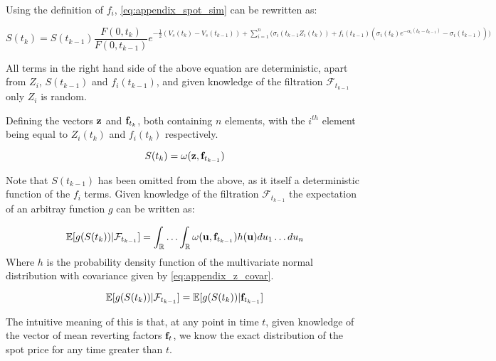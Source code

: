\documentclass{article}
\begin{document}
Using the definition of $f_i$, \ref{eq:appendix_spot_sim} can be rewritten as:

\begin{equation}
    S(t_k) = S(t_{k-1}) \frac{F(0, t_k)}{F(0, t_{k-1})} e^{- \frac{1}{2} (V_s(t_k) - 
    V_s(t_{k-1})) + \sum_{i=1}^n \bigl(\sigma_i(t_{k-1}Z_i(t_k)) + f_i(t_{k-1})
    (\sigma_i(t_k) e^{-\alpha_i (t_k - t_{k-1})} - \sigma_i(t_{k-1}) ) \bigr)}
\end{equation}

All terms in the right hand side of the above equation are deterministic, apart from 
$Z_i$, $S(t_{k-1})$ and $f_i(t_{k-1})$, and given knowledge of the filtration 
$\mathcal{F}_{t_{k-1}}$ only $Z_i$ is random.

\bigskip
Defining the vectors $\mathbf{z}$ and $\mathbf{f}_{t_k}$, both containing $n$ elements, with the $i^{th}$ element 
being equal to $Z_i(t_k)$ and $f_i(t_k)$ respectively.

\begin{equation}
    S(t_k) = \omega(\mathbf{z}, \mathbf{f}_{t_{k-1}})
\end{equation}

Note that $S(t_{k-1})$ has been omitted from the above, as it itself a deterministic
function of the $f_i$ terms.
Given knowledge of the filtration $\mathcal{F}_{t_{k-1}}$ the expectation of an arbitray
function $g$ can be written as:

\begin{equation}
    \mathbb{E}[g(S(t_k)) | \mathcal{F}_{t_{k-1}}] = 
        \int_\mathbb{R} \hdots \int_\mathbb{R} \omega(\mathbf{u}, \mathbf{f}_{t_{k-1}})
        h(\mathbf{u}) du_1 \hdots du_n
\end{equation}
Where $h$ is the probability density function of the multivariate normal distribution
with covariance given by \ref{eq:appendix_z_covar}.

\bigskip

\begin{equation}
    \mathbb{E}[g(S(t_k)) | \mathcal{F}_{t_{k-1}}] = \mathbb{E}[g(S(t_k)) | \mathbf{f}_{t_{k-1}}]
\end{equation}

The intuitive meaning of this is that, at any point in time $t$, given knowledge of the 
vector of mean reverting factors $\mathbf{f}_t$, we know the exact distribution of the 
spot price for any time greater than $t$.






\end{document}
